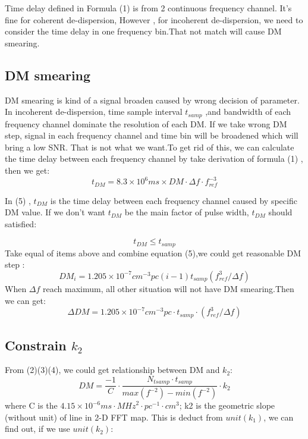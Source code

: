 \documentclass{article}
\begin{document}
Time delay defined in Formula (1) is from 2 continuous frequency channel. It's fine for coherent de-dispersion, However , for incoherent de-dispersion, we need to consider the time delay in one frequency bin.That not match will cause DM smearing. 

\subsection{DM smearing}

DM smearing is kind of a signal broaden caused by wrong decision of parameter. In incoherent de-dispersion, time sample interval $t_{samp}$ ,and bandwidth of each frequency channel dominate the resolution of each DM. If we take wrong DM step, signal in each frequency channel and time bin will be broadened which will bring a low SNR. That is not what we want.To get rid of this, we can calculate the time delay between each frequency channel by take derivation of formula (1) , then we get:
\begin{equation}
t_{DM}=8.3 \times 10^6ms \times DM \cdot \Delta f \cdot f^{-3}_{ref} 
\end{equation}


In (5) , $t_{DM}$ is the time delay between each frequency channel caused by specific DM value. If we don't want  $t_{DM}$ be the main factor of pulse width, $t_{DM}$ should satisfied:

{\centering \[ t_{DM} \leq t_{samp} \]}
Take equal of items above and combine equation (5),we could get  reasonable DM step :
\begin{equation}
DM_i = 1.205 \times 10^{-7} cm^{-3} pc (i-1) t_{samp}(f^3_{ref} / \Delta f)
\end{equation}
When $\Delta f $ reach maximum, all other situation will not have DM smearing.Then we can get:
\begin{equation}
\Delta DM=1.205 \times 10^{-7} cm^{-3} pc\cdot t_{samp}\cdot(f^3_{ref} / \Delta f)
\end{equation}
\subsection{Constrain $k_2$}
From (2)(3)(4), we could get relationship between DM and $k_2$:
\begin{equation}
DM = \frac{-1}{C}  \cdot\frac{N_{tsamp}\cdot t_{samp}}{max(f^{-2})-min(f^{-2})}\cdot k_2
\end{equation}
where C is the $4.15 \times 10^{-6} ms \cdot {MHz}^2 \cdot pc^{-1} \cdot cm^3$; k2 is the geometric slope (without unit) of line in 2-D FFT map. This is deduct from $unit(k_1)$, we can find out, if we use $unit(k_2)$:
\end{document}
